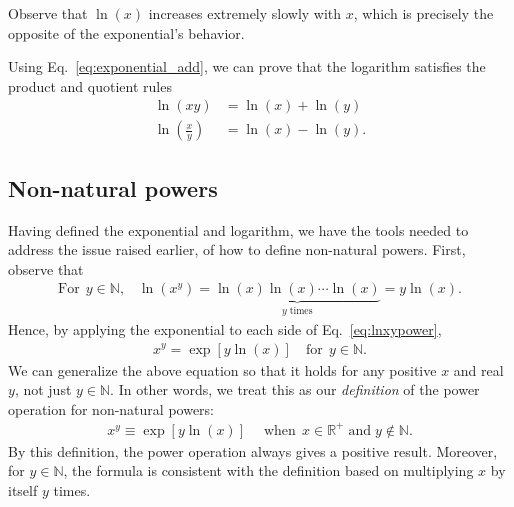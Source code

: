 \documentclass[10pt,a4paper]{article}
\begin{document}
\noindent
Observe that $\ln(x)$ increases extremely slowly with $x$, which is
precisely the opposite of the exponential's behavior.

Using Eq.~\eqref{eq:exponential_add}, we can prove that the logarithm
satisfies the product and quotient rules
\begin{align}
  \ln(xy) &= \ln(x) + \ln(y) \\
  \ln\left(\frac{x}{y}\right) &= \ln(x) - \ln(y).
\end{align}

\subsection{Non-natural powers}
\label{powers}

Having defined the exponential and logarithm, we have the tools needed
to address the issue raised earlier, of how to define non-natural
powers.  First, observe that
\begin{align}
  \textrm{For}\;\,y \in \mathbb{N}, \;\;\;\ln(x^y) = \underbrace{\ln(x)\ln(x)\cdots\ln(x)}_{y\;\text{times}} = y \ln(x).
  \label{eq:lnxypower}
\end{align}
Hence, by applying the exponential to each side of
Eq.~\eqref{eq:lnxypower},
\begin{align}
  x^y = \exp[y \ln(x)] \quad \mathrm{for} \;\,y \in \mathbb{N}.
\end{align}
We can generalize the above equation so that it holds for any positive
$x$ and real $y$, not just $y \in \mathbb{N}$.  In other words, we
treat this as our \textit{definition} of the power operation for
non-natural powers:
\begin{align}
  x^y \equiv \exp[y \ln(x)] \quad\; \mathrm{when}\;\, x \in \mathbb{R}^+\;\textrm{and}\;y \notin \mathbb{N}.
\end{align}
By this definition, the power operation always gives a positive
result.  Moreover, for $y \in \mathbb{N}$, the formula is consistent
with the definition based on multiplying $x$ by itself $y$ times.
\end{document}
